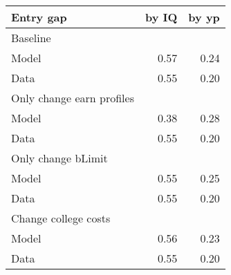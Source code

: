 \begin{tabular}{lrr}
\hline
Entry gap & by IQ  & by yp  \\
\hline
Baseline &   &   \\
Model & 0.57  & 0.24  \\
Data & 0.55  & 0.20  \\
Only change earn profiles &   &   \\
Model & 0.38  & 0.28  \\
Data & 0.55  & 0.20  \\
Only change bLimit &   &   \\
Model & 0.55  & 0.25  \\
Data & 0.55  & 0.20  \\
Change college costs &   &   \\
Model & 0.56  & 0.23  \\
Data & 0.55  & 0.20  \\
\hline
\end{tabular}%
